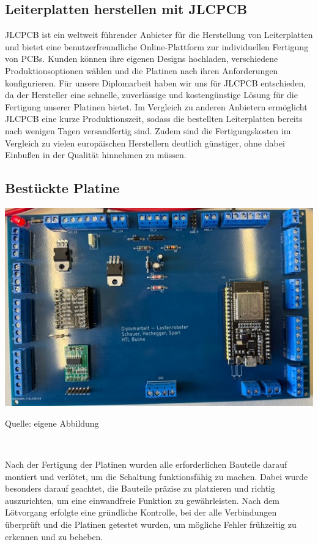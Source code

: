 \documentclass[ngerman,12pt,a4paper]{article}
\begin{document}
	\subsection{Leiterplatten herstellen mit JLCPCB}
	JLCPCB ist ein weltweit führender Anbieter für die Herstellung von Leiterplatten und bietet eine benutzerfreundliche Online-Plattform zur individuellen Fertigung von PCBs. Kunden können ihre eigenen Designs hochladen, verschiedene Produktionsoptionen wählen und die Platinen nach ihren Anforderungen konfigurieren. Für unsere Diplomarbeit haben wir uns für JLCPCB entschieden, da der Hersteller eine schnelle, zuverlässige und kostengünstige Lösung für die Fertigung unserer Platinen bietet. Im Vergleich zu anderen Anbietern ermöglicht JLCPCB eine kurze Produktionszeit, sodass die bestellten Leiterplatten bereits nach wenigen Tagen versandfertig sind. Zudem sind die Fertigungskosten im Vergleich zu vielen europäischen Herstellern deutlich günstiger, ohne dabei Einbußen in der Qualität hinnehmen zu müssen.
	
	\subsection{Bestückte Platine}
	\begin{center} 
		\begin{minipage}[t]{0.85\textwidth}
			\includegraphics[scale=0.9]{Pictures/Platine}
			\label{fig:i2c-anschlüsse}
			\vspace{-10pt}
			\begin{center}
				\par\small Quelle: eigene Abbildung
			\end{center}
		\end{minipage} \\[0.75cm]
	\end{center}
	Nach der Fertigung der Platinen wurden alle erforderlichen Bauteile darauf montiert und verlötet, um die Schaltung funktionsfähig zu machen. Dabei wurde besonders darauf geachtet, die Bauteile präzise zu platzieren und richtig auszurichten, um eine einwandfreie Funktion zu gewährleisten. Nach dem Lötvorgang erfolgte eine gründliche Kontrolle, bei der alle Verbindungen überprüft und die Platinen getestet wurden, um mögliche Fehler frühzeitig zu erkennen und zu beheben.
	
\end{document}
